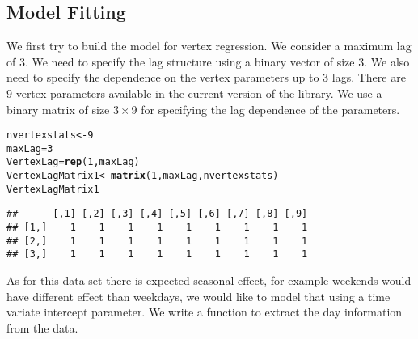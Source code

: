 \documentclass[12pt]{article}\usepackage[]{graphicx}\usepackage[]{color}
\makeatletter
\newcommand{\hlnum}[1]{\textcolor[rgb]{0.686,0.059,0.569}{#1}}%
\newcommand{\hlstd}[1]{\textcolor[rgb]{0.345,0.345,0.345}{#1}}%
\newcommand{\hlkwb}[1]{\textcolor[rgb]{0.69,0.353,0.396}{#1}}%
\newcommand{\hlkwd}[1]{\textcolor[rgb]{0.737,0.353,0.396}{\textbf{#1}}}%
\newenvironment{kframe}{%
 \def\at@end@of@kframe{}%
 \ifinner\ifhmode%
  \def\at@end@of@kframe{\end{minipage}}%
  \begin{minipage}{\columnwidth}%
 \fi\fi%
 \def\FrameCommand##1{\hskip\@totalleftmargin \hskip-\fboxsep
 \colorbox{shadecolor}{##1}\hskip-\fboxsep
     \hskip-\linewidth \hskip-\@totalleftmargin \hskip\columnwidth}%
 \MakeFramed {\advance\hsize-\width
   \@totalleftmargin\z@ \linewidth\hsize
   \@setminipage}}%
 {\par\unskip\endMakeFramed%
 \at@end@of@kframe}
\newenvironment{knitrout}{}{} %
\makeatother
\begin{document}
\subsection{Model Fitting}
\label{sec:model-fitting-beach}

We first try to build the model for vertex regression. We consider a maximum lag of 3. We need to specify the lag structure using a binary vector of size 3. We also need to specify the dependence on the vertex parameters up to 3 lags. There are $9$ vertex parameters available in the current version of the library. We use a binary matrix of size $3 \times 9$ for specifying the lag dependence of the parameters.

\begin{knitrout}
\color{fgcolor}\begin{kframe}
\begin{alltt}
\hlstd{nvertexstats} \hlkwb{<-} \hlnum{9}
\hlstd{maxLag} \hlkwb{=} \hlnum{3}
\hlstd{VertexLag} \hlkwb{=} \hlkwd{rep}\hlstd{(}\hlnum{1}\hlstd{, maxLag)}
\hlstd{VertexLagMatrix1} \hlkwb{<-} \hlkwd{matrix}\hlstd{(}\hlnum{1}\hlstd{, maxLag, nvertexstats)}
\hlstd{VertexLagMatrix1}
\end{alltt}
\begin{verbatim}
##      [,1] [,2] [,3] [,4] [,5] [,6] [,7] [,8] [,9]
## [1,]    1    1    1    1    1    1    1    1    1
## [2,]    1    1    1    1    1    1    1    1    1
## [3,]    1    1    1    1    1    1    1    1    1
\end{verbatim}
\end{kframe}
\end{knitrout}

As for this data set there is expected seasonal effect, for example weekends would have different effect than weekdays, we would like to model that using a time variate intercept parameter. We write a function to extract the day information from the data.
\end{document}
